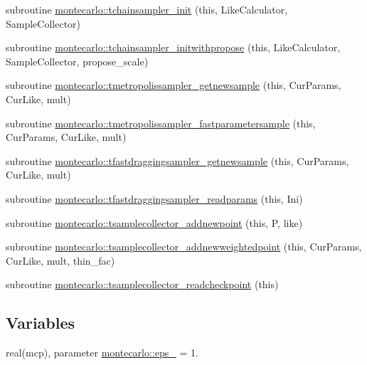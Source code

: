 \begin{DoxyCompactItemize}
\item 
subroutine \mbox{\hyperlink{namespacemontecarlo_a0eb56d8656442c96e8f066453a7b5209}{montecarlo\+::tchainsampler\+\_\+init}} (this, Like\+Calculator, Sample\+Collector)
\item 
subroutine \mbox{\hyperlink{namespacemontecarlo_ae01ead2e419d0e7cb8126beb7b6a1278}{montecarlo\+::tchainsampler\+\_\+initwithpropose}} (this, Like\+Calculator, Sample\+Collector, propose\+\_\+scale)
\item 
subroutine \mbox{\hyperlink{namespacemontecarlo_a8e8eb524291ad6abaafc4ec1cedaa916}{montecarlo\+::tmetropolissampler\+\_\+getnewsample}} (this, Cur\+Params, Cur\+Like, mult)
\item 
subroutine \mbox{\hyperlink{namespacemontecarlo_a52c8ac0f2608675d60fa454f684d0519}{montecarlo\+::tmetropolissampler\+\_\+fastparametersample}} (this, Cur\+Params, Cur\+Like, mult)
\item 
subroutine \mbox{\hyperlink{namespacemontecarlo_aabc2865a5460edaf007be6dca34d3eca}{montecarlo\+::tfastdraggingsampler\+\_\+getnewsample}} (this, Cur\+Params, Cur\+Like, mult)
\item 
subroutine \mbox{\hyperlink{namespacemontecarlo_a80c9edc811cd8126c1af36c89008a779}{montecarlo\+::tfastdraggingsampler\+\_\+readparams}} (this, Ini)
\item 
subroutine \mbox{\hyperlink{namespacemontecarlo_a2f05ea4c2552d9891ce8860f9befe96d}{montecarlo\+::tsamplecollector\+\_\+addnewpoint}} (this, P, like)
\item 
subroutine \mbox{\hyperlink{namespacemontecarlo_a23f6c5b28b5d65904c39f5a06efef97c}{montecarlo\+::tsamplecollector\+\_\+addnewweightedpoint}} (this, Cur\+Params, Cur\+Like, mult, thin\+\_\+fac)
\item 
subroutine \mbox{\hyperlink{namespacemontecarlo_afee20ae5c3f0b391ff0c231302a113a0}{montecarlo\+::tsamplecollector\+\_\+readcheckpoint}} (this)
\end{DoxyCompactItemize}
\subsection*{Variables}
\begin{DoxyCompactItemize}
\item 
real(mcp), parameter \mbox{\hyperlink{namespacemontecarlo_ac87b0e5ba62e656a1e0d3317a890c0d9}{montecarlo\+::eps\+\_}} = 1.
\end{DoxyCompactItemize}

